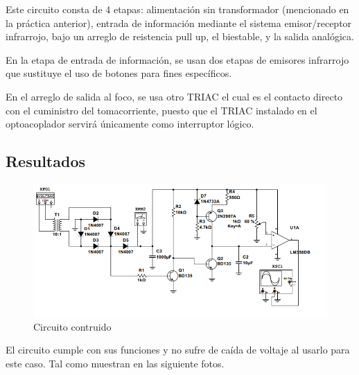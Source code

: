 Este circuito consta de 4 etapas: alimentación sin transformador (mencionado en la práctica anterior), entrada de información
mediante el sistema emisor/receptor infrarrojo, bajo un arreglo de reistencia pull up, el biestable, y la salida analógica.

En la etapa de entrada de información, se usan dos etapas de emisores infrarrojo que sustituye el uso de botones para
fines específicos.

En el arreglo de salida al foco, se usa otro TRIAC el cual es el contacto directo con el cuministro del tomacorriente, puesto
que el TRIAC instalado en el optoacoplador servirá únicamente como interruptor lógico.


\subsection{Resultados}

\begin{figure}[ht]
    \centering
    \includegraphics[scale=0.4]{media/Circuito.png}
    \caption{Circuito contruido}
    \label{Fig: Circuito contruido}
\end{figure}

El circuito cumple con sus funciones y no sufre de caída de voltaje al usarlo para este caso. Tal como muestran en las
siguiente fotos.

